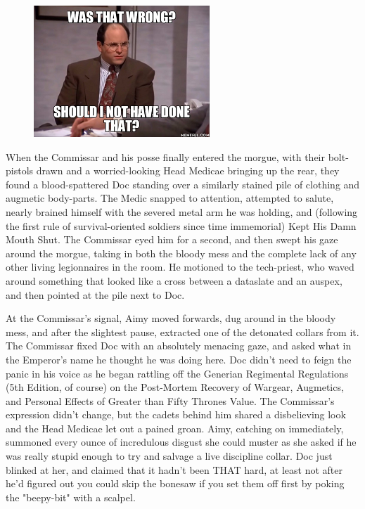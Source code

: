 \begin{figure}
	\begin{center}
		\includegraphics[width=\figwidth]{pics/21/29.png}
	\end{center}
\end{figure}
When the Commissar and his posse finally entered the morgue, with their bolt-pistols drawn and a worried-looking Head Medicae bringing up the rear, they found a blood-spattered Doc standing over a similarly stained pile of clothing and augmetic body-parts. 
The Medic snapped to attention, attempted to salute, nearly brained himself with the severed metal arm he was holding, and (following the first rule of survival-oriented soldiers since time immemorial) Kept His Damn Mouth Shut. 
The Commissar eyed him for a second, and then swept his gaze around the morgue, taking in both the bloody mess and the complete lack of any other living legionnaires in the room. 
He motioned to the tech-priest, who waved around something that looked like a cross between a dataslate and an auspex, and then pointed at the pile next to Doc. 


At the Commissar's signal, Aimy moved forwards, dug around in the bloody mess, and after the slightest pause, extracted one of the detonated collars from it. 
The Commissar fixed Doc with an absolutely menacing gaze, and asked what in the Emperor's name he thought he was doing here. 
Doc didn't need to feign the panic in his voice as he began rattling off the Generian Regimental Regulations (5th Edition, of course) on the Post-Mortem Recovery of Wargear, Augmetics, and Personal Effects of Greater than Fifty Thrones Value. 
The Commissar's expression didn't change, but the cadets behind him shared a disbelieving look and the Head Medicae let out a pained groan. 
Aimy, catching on immediately, summoned every ounce of incredulous disgust she could muster as she asked if he was really stupid enough to try and salvage a live discipline collar. 
Doc just blinked at her, and claimed that it hadn't been THAT hard, at least not after he'd figured out you could skip the bonesaw if you set them off first by poking the "beepy-bit" with a scalpel. 


